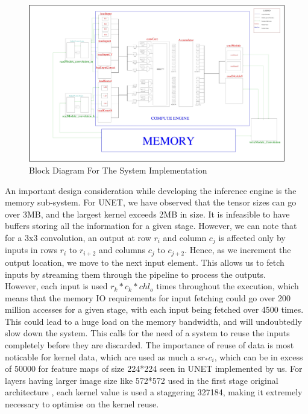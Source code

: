 \documentclass[a4paper,12pt, final]{report}
\begin{document}
\begin{figure}[h!]
    \centering
    \includegraphics[width=\textwidth]{block_dia.jpg}
    \caption{Block Diagram For The System Implementation}
    \label{fig:block_dia}
\end{figure}

An important design consideration while developing the inference engine is the memory sub-system. For UNET, we have observed that the tensor sizes can go over 3MB, and the largest kernel exceeds 2MB in size. It is infeasible to have buffers storing all the information for a given stage. However, we can note that for a 3x3 convolution, an output at row $r_i$ and column $c_j$ is affected only by inputs in rows $r_{i}$ to $r_{i+2}$ and columns $c_{j}$ to $c_{j+2}$. Hence, as we increment the output location, we move to the next input element. This allows us to fetch inputs by streaming them through the pipeline to process the outputs.
\\

However, each input is used $r_k*c_k*chl_o$ times throughout the execution, which means that the memory IO requirements for input fetching could go over 200 million accesses for a given stage, with each input being fetched over 4500 times. This could lead to a huge load on the memory bandwidth, and will undoubtedly slow down the system. This calls for the need of a system to reuse the inputs completely before they are discarded. The importance of reuse of data is most noticable for kernel data, which are used as much a s$r_*c_i$, which can be in excess of 50000 for feature maps of size 224*224 seen in UNET implemented by us. For layers having larger image size like 572*572 used in the first stage original architecture \cite{UNET}, each kernel value is used a staggering 327184, making it extremely necessary to optimise on the kernel reuse.
\\
\end{document}
